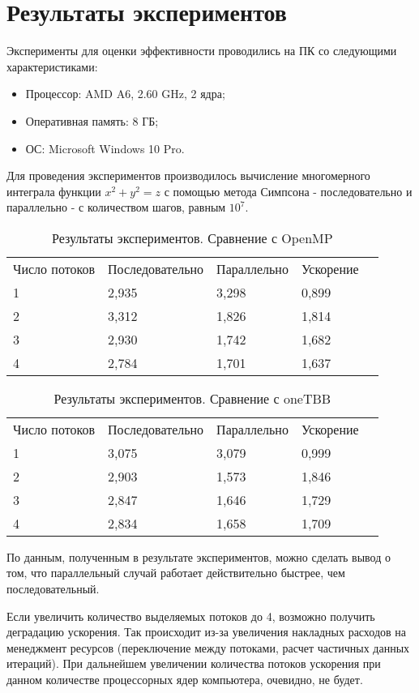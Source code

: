\documentclass{report}
\begin{document}
\section*{Результаты экспериментов}
Эксперименты для оценки эффективности проводились на ПК со следующими характеристиками:

\begin{itemize}
\item Процессор: AMD A6, 2.60 GHz, 2 ядра;
\item Оперативная память: 8 ГБ;
\item ОС: Microsoft Windows 10 Pro.
\end{itemize}

\par Для проведения экспериментов производилось вычисление многомерного интеграла функции $x^2 + y^2 = z$ с помощью метода Симпсона - последовательно и параллельно - с количеством шагов, равным $10^7$.

\begin{table}[!h]
\caption{Результаты экспериментов. Сравнение с OpenMP}
\centering
\begin{tabular}{lllll}
Число потоков & Последовательно & Параллельно & Ускорение \\
1 & 2,935 & 3,298 & 0,899 \\
2 & 3,312 & 1,826 & 1,814 \\
3 & 2,930 & 1,742 & 1,682 \\
4 & 2,784 & 1,701 & 1,637
\end{tabular}
\end{table}

\begin{table}[!h]
\caption{Результаты экспериментов. Сравнение с oneTBB}
\centering
\begin{tabular}{lllll}
Число потоков & Последовательно & Параллельно & Ускорение \\
1 & 3,075 & 3,079 & 0,999 \\
2 & 2,903 & 1,573 & 1,846 \\
3 & 2,847 & 1,646 & 1,729 \\
4 & 2,834 & 1,658 & 1,709
\end{tabular}
\end{table}

\par По данным, полученным в результате экспериментов, можно сделать вывод о том, что параллельный случай работает действительно быстрее, чем последовательный.
\par Если увеличить количество выделяемых потоков до 4, возможно получить деградацию ускорения. Так происходит из-за увеличения накладных расходов на менеджмент ресурсов (переключение между потоками, расчет частичных данных итераций). При дальнейшем увеличении количества потоков ускорения при данном количестве процессорных ядер компьютера, очевидно, не будет.
\newpage
\end{document}
